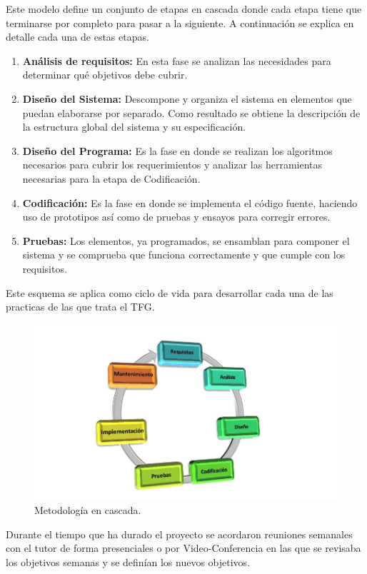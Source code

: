 Este modelo define un conjunto de etapas en cascada donde cada etapa tiene que terminarse por completo para pasar a la siguiente. A continuación se explica en detalle cada una de estas etapas.
\begin{enumerate}
\item \textbf{Análisis de requisitos:} En esta fase se analizan las necesidades para determinar qué objetivos debe cubrir.
\item \textbf{Diseño del Sistema:} Descompone y organiza el sistema en elementos que puedan elaborarse por separado. Como resultado se obtiene la descripción de la estructura global del sistema y su especificación.
\item \textbf{Diseño del Programa:} Es la fase en donde se realizan los algoritmos necesarios para cubrir los requerimientos y analizar las herramientas necesarias para la etapa de Codificación.
\item \textbf{Codificación:} Es la fase en donde se implementa el código fuente, haciendo uso de prototipos así como de pruebas y ensayos para corregir errores.
\item \textbf{Pruebas:} Los elementos, ya programados, se ensamblan para componer el sistema y se comprueba que funciona correctamente y que cumple con los requisitos.
\end{enumerate}
Este esquema se aplica como ciclo de vida para desarrollar cada una de las practicas de las que trata el TFG.
\begin{figure}[!h]
\centering
\includegraphics[width=0.8\linewidth]{Figures/cascada}
\decoRule
\caption[Metodología en cascada]{Metodología en cascada.}
\label{fig:espiral}
\end{figure}

Durante el tiempo que ha durado el proyecto se acordaron reuniones semanales con el tutor de forma presenciales o por Video-Conferencia en las que se revisaba los objetivos semanas y se definían los nuevos objetivos.

